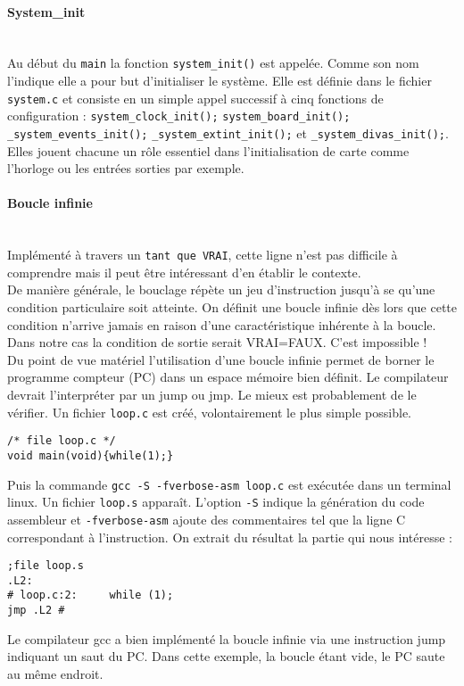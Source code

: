 \documentclass[a4paper]{article}
\begin{document}
\paragraph{System\_init}
~~\\
Au début du \texttt{main} la fonction \texttt{system\_init()} est appelée. Comme son nom l'indique elle a pour but d'initialiser le système. Elle est définie dans le fichier \texttt{system.c} et consiste en un simple appel successif à cinq fonctions de configuration : 	 
	\texttt{system\_clock\_init();}
	 \texttt{system\_board\_init();}
	 \texttt{\_system\_events\_init();}
	 \texttt{\_system\_extint\_init();}
	 et  \texttt{\_system\_divas\_init();}.
Elles jouent chacune un rôle essentiel dans l'initialisation de carte comme l'horloge ou les entrées sorties par exemple.

\paragraph{Boucle infinie}
~~\\
Implémenté à travers un \texttt{tant que VRAI}, cette ligne n'est pas difficile à comprendre mais il peut être intéressant d'en établir le contexte. \\
De manière générale, le bouclage répète un jeu d'instruction jusqu'à se qu'une condition particulaire soit atteinte. On définit une boucle infinie dès lors que cette condition n'arrive jamais en raison d'une caractéristique inhérente à la boucle. Dans notre cas la condition de sortie serait VRAI=FAUX. C'est impossible ! \\
Du point de vue matériel l'utilisation d'une boucle infinie permet de borner le programme compteur (PC) dans un espace mémoire bien définit. Le compilateur devrait l'interpréter par un jump ou jmp. Le mieux est probablement de le vérifier. Un fichier \texttt{loop.c} est créé, volontairement le plus simple possible.
\begin{lstlisting}[style=CStyle]
/* file loop.c */
void main(void){while(1);}
\end{lstlisting}
Puis la commande \texttt{gcc -S -fverbose-asm loop.c} est exécutée dans un terminal linux. Un fichier \texttt{loop.s} apparaît. L'option \texttt{-S} indique la génération du code assembleur et \texttt{-fverbose-asm} ajoute des commentaires tel que la ligne C correspondant à l'instruction. On extrait du résultat la partie qui nous intéresse :
\begin{lstlisting}[language={[x86masm]Assembler}]
;file loop.s
.L2:
# loop.c:2: 	while (1);
jmp	.L2	#
\end{lstlisting}
Le compilateur gcc a bien implémenté la boucle infinie via une instruction jump indiquant un saut du PC. Dans cette exemple, la boucle étant vide, le PC saute au même endroit.
\end{document}
